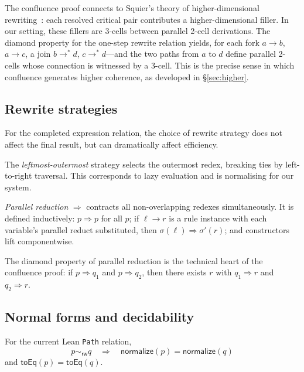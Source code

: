 \documentclass[manuscript]{BSLstyle}
\newcommand{\rweq}{\sim_{\mathsf{rw}}}
\begin{document}
\begin{remark}
The confluence proof connects to Squier's theory of higher-dimensional
rewriting~\cite{Squier87}: each resolved critical pair contributes a
higher-dimensional filler.  In our setting, these fillers are 3-cells
between parallel 2-cell derivations.  The diamond property for the
one-step rewrite relation yields, for each fork $a \to b$, $a \to c$,
a join $b \to^* d$, $c \to^* d$---and the two paths from $a$ to $d$
define parallel 2-cells whose connection is witnessed by a 3-cell.
This is the precise sense in which confluence generates higher coherence,
as developed in \S\ref{sec:higher}.
\end{remark}

\subsection{Rewrite strategies}

For the completed expression relation, the choice of rewrite strategy does not
affect the final result, but can dramatically affect efficiency.

\begin{definition}
The \emph{leftmost-outermost} strategy selects the outermost redex,
breaking ties by left-to-right traversal.  This corresponds to lazy
evaluation and is normalising for our system.
\end{definition}

\begin{definition}
\emph{Parallel reduction} $\Rightarrow$ contracts all non-overlapping
redexes simultaneously.  It is defined inductively:
$p \Rightarrow p$ for all $p$; if $\ell \to r$ is a rule instance with
each variable's parallel reduct substituted, then $\sigma(\ell) \Rightarrow
\sigma'(r)$; and constructors lift componentwise.
\end{definition}

The diamond property of parallel reduction is the technical heart of the
confluence proof: if $p \Rightarrow q_1$ and $p \Rightarrow q_2$, then
there exists $r$ with $q_1 \Rightarrow r$ and $q_2 \Rightarrow r$.

\subsection{Normal forms and decidability}

\begin{theorem}\label{thm:unique-nf}
For the current Lean \texttt{Path} relation,
\[
  p\rweq q\quad\Longrightarrow\quad
  \mathsf{normalize}(p)=\mathsf{normalize}(q)
\]
and \(\mathsf{toEq}(p)=\mathsf{toEq}(q)\).
\end{theorem}
\end{document}

